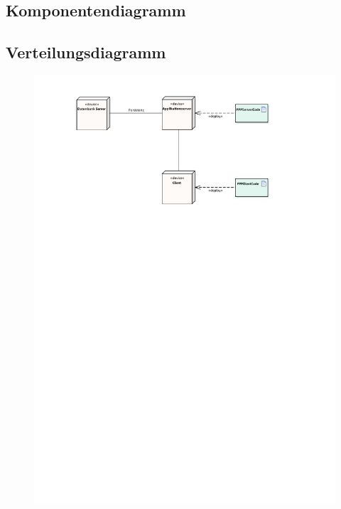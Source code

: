 \subsection*{Komponentendiagramm}
\begin{figure}[h!]
	\centering
	\label{fig:CompDia}
\end{figure}

\vfill

\subsection*{Verteilungsdiagramm}
\begin{figure}[h!]
	\centering
	\includegraphics[width = 0.8\linewidth]{docs/8_Verteilungsdiagramm/DeploymentDiagram.pdf}
	\label{fig:VerteilungsDia}
\end{figure}